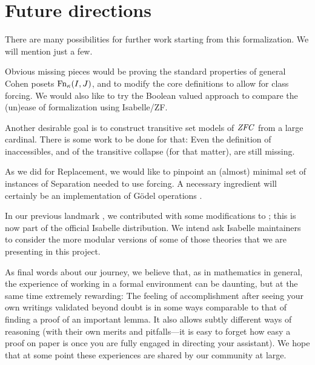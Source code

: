 \section{Future directions}
\label{sec:conclusion}

There are many possibilities for further work starting from this
formalization. We will mention just a few.

Obvious missing pieces would be proving the standard properties of
general Cohen posets $\operatorname{Fn}_\kappa(I,J)$, and to modify the core
definitions to allow for class forcing. We would also like to try the
Boolean valued approach to compare the (un)ease of formalization using
Isabelle/ZF.

Another desirable goal is to construct transitive set models of $\mathit{ZFC}$
from a large cardinal. There is some work to be done for that: Even the
definition of inaccessibles, and of the transitive collapse (for that
matter), are still missing.

As we did for Replacement, we would like to pinpoint an (almost)
minimal set of instances of
Separation needed to use forcing. A necessary ingredient will
certainly be an implementation of Gödel operations
\cite[Thm.~13.4]{Jech_Millennium}.

In our previous landmark \cite{2020arXiv200109715G}, we contributed
with some modifications to ; this is now
part of the official Isabelle distribution.  We intend ask Isabelle
maintainers to consider the more modular versions of some of those
theories that we are presenting in this project.

As final words about our journey, we believe that, as in mathematics
in general, the experience of working in a formal environment can be
daunting, but at the same time extremely rewarding: The feeling of
accomplishment after seeing your own writings validated beyond doubt is
in some ways comparable to that of finding a proof of an important
lemma. It also allows subtly different ways of reasoning (with their
own merits and pitfalls---it is easy to forget how easy a proof on
paper is once you are fully engaged in directing your assistant). We
hope that at some point these experiences are shared by our community
at large.


